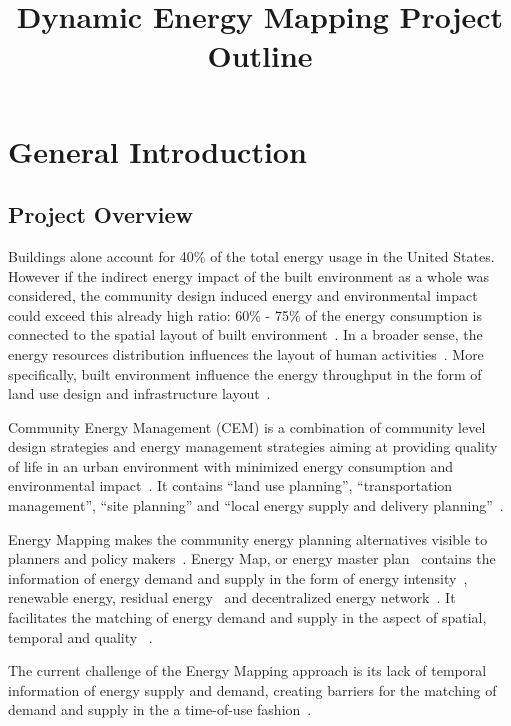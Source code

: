 \documentclass[hidelinks,12pt]{article}
\begin{document}
\title{Dynamic Energy Mapping Project Outline}
\maketitle
\tableofcontents
\newpage
\section{General Introduction}
\subsection{Project Overview}
Buildings alone account for 40\% of the total energy usage in the
United States. However if the indirect energy impact of the built
environment as a whole was considered, the community design induced
energy and environmental impact could exceed this already high ratio:
60\% - 75\% of the energy consumption is connected to the spatial
layout of built environment~\cite{Owens199281}. In a broader sense,
the energy resources distribution influences the layout of human
activities~\cite{Owens199281}. More specifically, built environment
influence the energy throughput in the form of land use design and
infrastructure layout~\cite{Jaccard19971065}. 

Community Energy Management (CEM) is a combination of community level
design strategies and energy management strategies aiming at providing
quality of life in an urban environment with minimized energy
consumption and environmental impact~\cite{Jaccard19971065}. It
contains ``land use planning'', ``transportation management'', ``site
planning'' and ``local energy supply and delivery planning''~\cite{Jaccard19971065}.

Energy Mapping makes the community energy planning alternatives
visible to planners and policy makers~\cite{baird2014}. Energy Map, or
energy master plan~\cite{londonHeatMap} contains the information of
energy demand and supply in the form of energy
intensity~\cite{baird2014}, renewable energy, residual
energy~\cite{Dobbelsteen2013} and decentralized energy
network~\cite{decentralHeatMap2011}. It facilitates the matching of
energy demand and supply in the aspect of spatial, temporal and
quality ~\cite{Dobbelsteen2013}. 

The current challenge of the Energy Mapping approach is its lack of
temporal information of energy supply and demand, creating barriers
for the matching of demand and supply in the a time-of-use
fashion~\cite{baird2014}.
\end{document}
